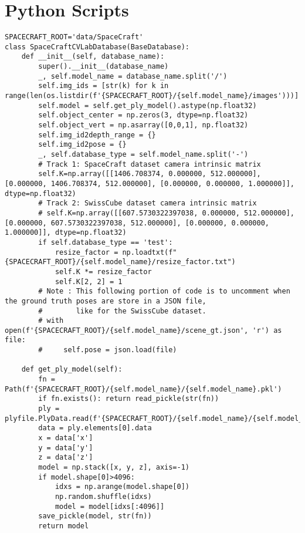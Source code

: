 \chapter{Python Scripts}


\begin{lstlisting}[style=pythonstyle, label=lst:1, caption=Python code of the data loading class \texttt{SpaceCraftCVLabDatabase()} from file \texttt{database.py}.]
SPACECRAFT_ROOT='data/SpaceCraft'
class SpaceCraftCVLabDatabase(BaseDatabase):
    def __init__(self, database_name):
        super().__init__(database_name)
        _, self.model_name = database_name.split('/')
        self.img_ids = [str(k) for k in range(len(os.listdir(f'{SPACECRAFT_ROOT}/{self.model_name}/images')))]
        self.model = self.get_ply_model().astype(np.float32)
        self.object_center = np.zeros(3, dtype=np.float32)
        self.object_vert = np.asarray([0,0,1], np.float32)
        self.img_id2depth_range = {}
        self.img_id2pose = {}
        _, self.database_type = self.model_name.split('-')
        # Track 1: SpaceCraft dataset camera intrinsic matrix
        self.K=np.array([[1406.708374, 0.000000, 512.000000], [0.000000, 1406.708374, 512.000000], [0.000000, 0.000000, 1.000000]], dtype=np.float32)
        # Track 2: SwissCube dataset camera intrinsic matrix
        # self.K=np.array([[607.5730322397038, 0.000000, 512.000000], [0.000000, 607.5730322397038, 512.000000], [0.000000, 0.000000, 1.000000]], dtype=np.float32)
        if self.database_type == 'test':
            resize_factor = np.loadtxt(f"{SPACECRAFT_ROOT}/{self.model_name}/resize_factor.txt")
            self.K *= resize_factor
            self.K[2, 2] = 1
        # Note : This following portion of code is to uncomment when the ground truth poses are store in a JSON file,
        #        like for the SwissCube dataset.
        # with open(f'{SPACECRAFT_ROOT}/{self.model_name}/scene_gt.json', 'r') as file:
        #     self.pose = json.load(file)

    def get_ply_model(self):
        fn = Path(f'{SPACECRAFT_ROOT}/{self.model_name}/{self.model_name}.pkl')
        if fn.exists(): return read_pickle(str(fn))
        ply = plyfile.PlyData.read(f'{SPACECRAFT_ROOT}/{self.model_name}/{self.model_name}.ply')
        data = ply.elements[0].data
        x = data['x']
        y = data['y']
        z = data['z']
        model = np.stack([x, y, z], axis=-1)
        if model.shape[0]>4096:
            idxs = np.arange(model.shape[0])
            np.random.shuffle(idxs)
            model = model[idxs[:4096]]
        save_pickle(model, str(fn))
        return model


\end{lstlisting}
